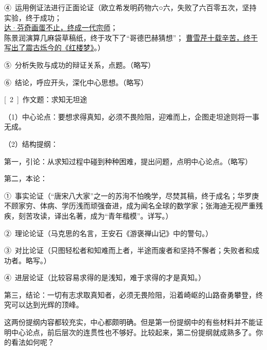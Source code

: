 ④\ 运用例证法进行正面论证（欧立希发明药物六○六，失败了六百零五次，坚持实验，终于成功；\\ 
\uline{达·芬奇画蛋不止，终成一代宗师}；\\ 
陈景润演算几麻袋草稿纸，终于攻下了“哥德巴赫猜想”；
\uline{曹雪芹十载辛苦，终于写出了震古烁今的《红楼梦》}。）

⑤\ 分析失败与成功的辩证关系，点题。（略写）

⑥\ 结论，呼应开头，深化中心思想。（略写）
\newpage

[\ 2\ ]\ 作文题：求知无坦途

（1）中心论点：要想求得真知，必须不畏险阻，迎难而上，企图走坦途则将一事无成。

（2）结构提纲：

第一，引论：从求知过程中碰到种种困难，提出问题，点明中心论点。（略写）

第二，本论：

①\ 事实论证（“唐宋八大家”之一的苏洵不怕晚学，尽焚其稿，终于成名；华罗庚不顾家穷、体病、学历浅而顽强奋进，成为闻名全球的数学家；张海迪无视严重残疾，刻苦攻读，译出名著，成为“青年楷模”。详写。）

②\ 理论论证（马克思的名言，王安石《游褒禅山记》中的警句。）

③\ 对比论证（只图轻松者和知难而上者，半途而废者和坚持不懈者；失败者和成功者。略写。）

④\ 进层论证（比较容易求得的是浅知，难于求得的才是真知。）

第三，结论：一切有志求取真知者，必须无畏险阻，沿着崎岖的山路奋勇攀登，终究可以达到光辉的顶峰。

这两份提纲内容都较充实，中心都颇明确。但是第一份提纲中的有些材料并不能证明中心论点，前后层次的连贯性也不够好。比较起来，第二份提纲就成熟多了。你的看法如何呢？
\newpage